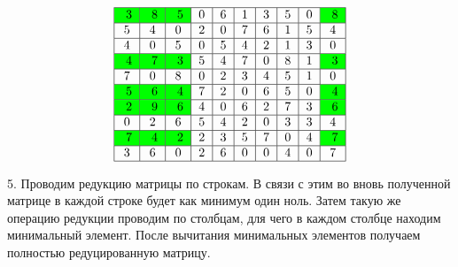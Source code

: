 \documentclass{article}
\begin{document}
\[
    \begin{tabular}{|c|c|c|c|c|c|c|c|c|c|}
        \hline
        \cellcolor{green} 3 & \cellcolor{green} 8 & \cellcolor{green} 5 & 0 & 6 & 1 & 3 & 5 & 0 & \cellcolor{green} 8 \\
        \hline
        5                   & 4                   & 0                   & 2 & 0 & 7 & 6 & 1 & 5 & 4                   \\
        \hline
        4                   & 0                   & 5                   & 0 & 5 & 4 & 2 & 1 & 3 & 0                   \\
        \hline
        \cellcolor{green} 4 & \cellcolor{green} 7 & \cellcolor{green} 3 & 5 & 4 & 7 & 0 & 8 & 1 & \cellcolor{green} 3 \\
        \hline
        7                   & 0                   & 8                   & 0 & 2 & 3 & 4 & 5 & 1 & 0                   \\
        \hline
        \cellcolor{green} 5 & \cellcolor{green} 6 & \cellcolor{green} 4 & 7 & 2 & 0 & 6 & 5 & 0 & \cellcolor{green} 4 \\
        \hline
        \cellcolor{green} 2 & \cellcolor{green} 9 & \cellcolor{green} 6 & 4 & 0 & 6 & 2 & 7 & 3 & \cellcolor{green} 6 \\
        \hline
        0                   & 2                   & 6                   & 5 & 4 & 2 & 0 & 3 & 3 & 4                   \\
        \hline
        \cellcolor{green} 7 & \cellcolor{green} 4 & \cellcolor{green} 2 & 2 & 3 & 5 & 7 & 0 & 4 & \cellcolor{green} 7 \\
        \hline
        3                   & 6                   & 0                   & 2 & 6 & 0 & 0 & 4 & 0 & 7                   \\
        \hline
    \end{tabular}
\]

5. Проводим редукцию матрицы по строкам. В связи с этим во вновь полученной матрице в каждой строке будет как минимум один ноль.
Затем такую же операцию редукции проводим по столбцам, для чего в каждом столбце находим минимальный элемент.
После вычитания минимальных элементов получаем полностью редуцированную матрицу.
\end{document}
